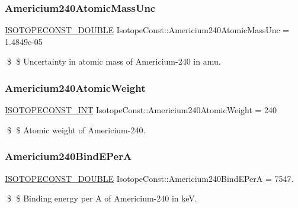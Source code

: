 \subsubsection{\texorpdfstring{Americium240\+Atomic\+Mass\+Unc}{Americium240AtomicMassUnc}}
{\footnotesize\ttfamily \mbox{\hyperlink{group___isotope_const-_macros_ga8f45a7272ce02c0b4c65c44636ed719a}{I\+S\+O\+T\+O\+P\+E\+C\+O\+N\+S\+T\+\_\+\+D\+O\+U\+B\+LE}} Isotope\+Const\+::\+Americium240\+Atomic\+Mass\+Unc = 1.\+4849e-\/05}

\$ \$ Uncertainty in atomic mass of Americium-\/240 in amu. \mbox{\label{group___isotope_const-_americium-_am240_ga1ab7d65cb74181908d9c0286518e403e}} 
\subsubsection{\texorpdfstring{Americium240\+Atomic\+Weight}{Americium240AtomicWeight}}
{\footnotesize\ttfamily \mbox{\hyperlink{group___isotope_const-_macros_ga5f18360b3e99483a35c32d789e62621c}{I\+S\+O\+T\+O\+P\+E\+C\+O\+N\+S\+T\+\_\+\+I\+NT}} Isotope\+Const\+::\+Americium240\+Atomic\+Weight = 240}

\$ \$ Atomic weight of Americium-\/240. \mbox{\label{group___isotope_const-_americium-_am240_ga9a273e7849b307b8c7bc29c30e0104c2}} 
\subsubsection{\texorpdfstring{Americium240\+Bind\+E\+PerA}{Americium240BindEPerA}}
{\footnotesize\ttfamily \mbox{\hyperlink{group___isotope_const-_macros_ga8f45a7272ce02c0b4c65c44636ed719a}{I\+S\+O\+T\+O\+P\+E\+C\+O\+N\+S\+T\+\_\+\+D\+O\+U\+B\+LE}} Isotope\+Const\+::\+Americium240\+Bind\+E\+PerA = 7547.}

\$ \$ Binding energy per A of Americium-\/240 in keV. \mbox{\label{group___isotope_const-_americium-_am240_ga33cbd93f05ab942dfbe9096a041f6fc8}} 
